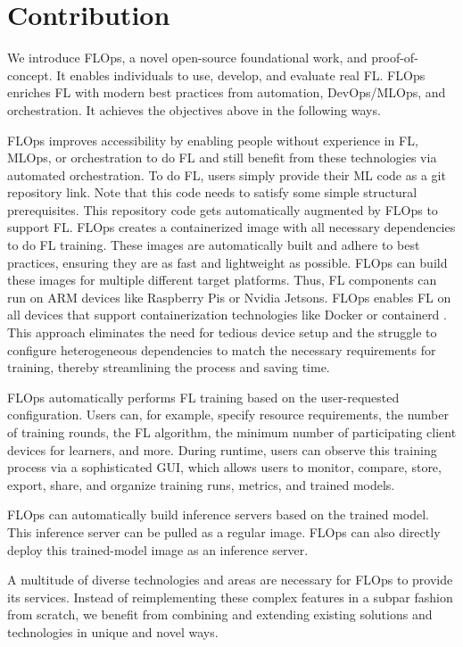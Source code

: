 
\section{Contribution}

We introduce FLOps, a novel open-source foundational work, and proof-of-concept.
It enables individuals to use, develop, and evaluate real FL.
FLOps enriches FL with modern best practices from automation, DevOps/MLOps, and orchestration.
It achieves the objectives above in the following ways.

FLOps improves accessibility by enabling people without experience in
FL, MLOps, or orchestration to do FL and still benefit from these technologies via automated orchestration.
To do FL, users simply provide their ML code as a git repository link.
Note that this code needs to satisfy some simple structural prerequisites.
This repository code gets automatically augmented by FLOps to support FL.
FLOps creates a containerized image with all necessary dependencies to do FL training.
These images are automatically built and adhere to best practices, ensuring they are
as fast and lightweight as possible.
FLOps can build these images for multiple different target platforms.
Thus, FL components can run on ARM devices like Raspberry Pis or Nvidia Jetsons.
FLOps enables FL on all devices that support containerization technologies
like Docker \cite{docker_docs} or containerd \cite{containerd_docs}.
This approach eliminates the need for tedious device setup and the struggle to configure
heterogeneous dependencies to match the necessary requirements for training, thereby streamlining the
process and saving time.

FLOps automatically performs FL training based on the user-requested configuration.
Users can, for example, specify resource requirements, the number of training rounds, the FL algorithm,
the minimum number of participating client devices for learners, and more.
During runtime, users can observe this training process via a sophisticated GUI,
which allows users to monitor, compare, store, export, share, and organize training runs,
metrics, and trained models.

FLOps can automatically build inference servers based on the trained model.
This inference server can be pulled as a regular image.
FLOps can also directly deploy this trained-model image as an inference server.

A multitude of diverse technologies and areas are necessary
for FLOps to provide its services.
Instead of reimplementing these complex features in a subpar fashion from scratch,
we benefit from combining and extending existing solutions and technologies in unique and novel ways.

